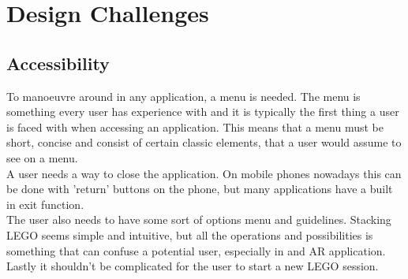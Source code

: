 
\section{Design Challenges}
\subsection{Accessibility}
To manoeuvre around in any application, a menu is needed. The menu is something every user has experience with and it is typically the first thing a user is faced with when accessing an application. This means that a menu must be short, concise and consist of certain classic elements, that a user would assume to see on a menu.\\ A user needs a way to close the application. On mobile phones nowadays this can be done with 'return' buttons on the phone, but many applications have a built in exit function.\\
The user also needs to have some sort of options menu and guidelines. Stacking LEGO seems simple and intuitive, but all the operations and possibilities is something that can confuse a potential user, especially in and AR application. \\
Lastly it shouldn't be complicated for the user to start a new LEGO session.
